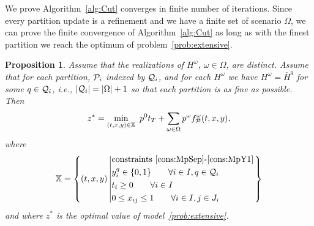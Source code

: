 \documentclass[11pt]{article}
\newtheorem{proposition}[theorem]{Proposition}
\newcommand{\cQ}{{\cal Q}}
\newcommand{\cP}{{\cal P}}
\newcommand{\cH}{{\cal H}}
\newcommand{\tcr}{\textcolor{red}}
\begin{document}
	We prove Algorithm~\ref{alg:Cut} converges in finite number of iterations. Since every partition update is a refinement and we have a finite set of scenario \(\Omega\), we can prove the finite convergence of Algorithm~\ref{alg:Cut} as long as with the finest partition we reach the optimum of problem~\eqref{prob:extensive}.
 
	\begin{proposition} \label{prop:finestPar}
	Assume that the realizations of $H^\omega$, $\omega \in \Omega$, are distinct. Assume that for each partition, \({\cP}_i\) indexed by $\cQ_i$, and for each $H^\omega$ we have $H^\omega=\bar{H}^q$ for some $q \in \cQ_i$, i.e., $|\cQ_i|=|\Omega|+1$ so that each partition is as fine as possible. Then 
    \begin{equation}\label{eqn:proposition_equivalent}
        z^* = \min_{(t,x,y) \in \mathbb{X}}\ p^0 t_T + \sum_{\omega \in \Omega} p^\omega f^\omega_{{\cP}}(t,x,y),
    \end{equation}
		where 
		\begin{equation*}
			\mathbb{X} = \left\{(t,x,y) \left| 
			\begin{aligned}
			& \text{constraints } \eqref{cons:MpSep}\mbox{-}\eqref{cons:MpY1}\\ 
			&y_i^q \in \{0,1\} \qquad \forall i \in I, q \in {\cQ}_i\\
			& t_i \geq 0 \qquad \forall i \in I\\
			& 0 \leq x_{ij} \leq 1 \qquad \forall i \in I, j \in J_i
			\end{aligned}
			\right. \right\}
		\end{equation*}
	and where $z^*$ is the optimal value of model~\eqref{prob:extensive}.
	\end{proposition}
\end{document}
